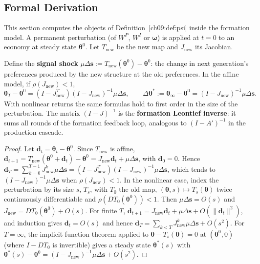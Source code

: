 \documentclass[../structural_economics_book.tex]{subfiles}
\begin{document}
\subsection{Formal Derivation}

This section computes the objects of Definition~\ref{ch09:def:psi} inside the formation model. A permanent perturbation (of $W^P$, $W^I$ or $\boldsymbol{\omega}$) is applied at $t = 0$ to an economy at steady state $\boldsymbol{\theta}^0$. Let $T_{\text{new}}$ be the new map and $J_{\text{new}}$ its Jacobian.

\begin{theorem}\label{ch10:thm:formation_effect}
Define the \textbf{signal shock} $\mu\Delta\mathbf{s} := T_{\text{new}}(\boldsymbol{\theta}^0) - \boldsymbol{\theta}^0$: the change in next generation's preferences produced by the new structure at the old preferences. In the affine model, if $\rho(J_{\text{new}}) < 1$,
\begin{equation}\label{ch10:eq:delta_theta}
\boldsymbol{\theta}_T - \boldsymbol{\theta}^0 = \left(I - J_{\text{new}}^T\right)(I - J_{\text{new}})^{-1}\mu\Delta\mathbf{s}, \qquad
\Delta\boldsymbol{\theta}^* := \boldsymbol{\theta}_\infty - \boldsymbol{\theta}^0 = (I - J_{\text{new}})^{-1}\mu\Delta\mathbf{s}.
\end{equation}
With nonlinear returns the same formulas hold to first order in the size of the perturbation. The matrix $(I - J)^{-1}$ is the \textbf{formation Leontief inverse}: it sums all rounds of the formation feedback loop, analogous to $(I - A')^{-1}$ in the production cascade.
\end{theorem}

\begin{proof}
Let $\mathbf{d}_t = \boldsymbol{\theta}_t - \boldsymbol{\theta}^0$. Since $T_{\text{new}}$ is affine, $\mathbf{d}_{t+1} = T_{\text{new}}(\boldsymbol{\theta}^0 + \mathbf{d}_t) - \boldsymbol{\theta}^0 = J_{\text{new}}\mathbf{d}_t + \mu\Delta\mathbf{s}$, with $\mathbf{d}_0 = 0$. Hence $\mathbf{d}_T = \sum_{k=0}^{T-1}J_{\text{new}}^k\mu\Delta\mathbf{s} = (I - J_{\text{new}}^T)(I - J_{\text{new}})^{-1}\mu\Delta\mathbf{s}$, which tends to $(I - J_{\text{new}})^{-1}\mu\Delta\mathbf{s}$ when $\rho(J_{\text{new}}) < 1$. In the nonlinear case, index the perturbation by its size $s$, $T_s$, with $T_0$ the old map, $(\boldsymbol{\theta}, s) \mapsto T_s(\boldsymbol{\theta})$ twice continuously differentiable and $\rho(DT_0(\boldsymbol{\theta}^0)) < 1$. Then $\mu\Delta\mathbf{s} = O(s)$ and $J_{\text{new}} = DT_0(\boldsymbol{\theta}^0) + O(s)$. For finite $T$, $\mathbf{d}_{t+1} = J_{\text{new}}\mathbf{d}_t + \mu\Delta\mathbf{s} + O(\|\mathbf{d}_t\|^2)$, and induction gives $\mathbf{d}_t = O(s)$ and hence $\mathbf{d}_T = \sum_{k<T} J_{\text{new}}^k\mu\Delta\mathbf{s} + O(s^2)$. For $T = \infty$, the implicit function theorem applied to $\boldsymbol{\theta} - T_s(\boldsymbol{\theta}) = 0$ at $(\boldsymbol{\theta}^0, 0)$ (where $I - DT_0$ is invertible) gives a steady state $\boldsymbol{\theta}^*(s)$ with $\boldsymbol{\theta}^*(s) - \boldsymbol{\theta}^0 = (I - J_{\text{new}})^{-1}\mu\Delta\mathbf{s} + O(s^2)$.
\end{proof}
\end{document}
